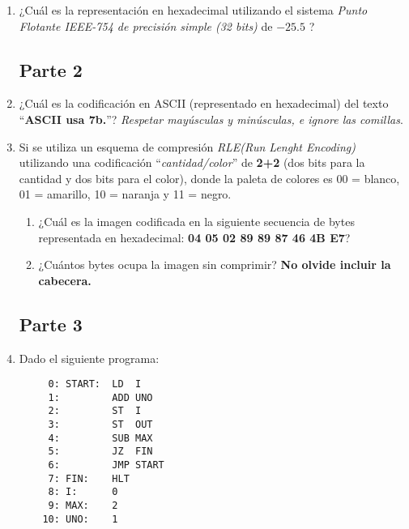 \documentclass[12pt]{article}
\begin{document}
\begin{enumerate}
    \item ¿Cuál es la representación en hexadecimal utilizando el sistema
        \emph{Punto Flotante IEEE-754 de precisión simple (32 bits)} de
        $-25.5$ ?

\subsection*{Parte 2}

    \item ¿Cuál es la codificación en ASCII (representado en hexadecimal) del
        texto ``\textbf{ASCII usa 7b.}''? \emph{Respetar mayúsculas y
        minúsculas, e ignore las comillas}.

    \item Si se utiliza un esquema de compresión \emph{RLE(Run Lenght
        Encoding)} utilizando una codificación ``\emph{cantidad/color}'' de
        \textbf{2+2} (dos bits para la cantidad y dos bits para el color),
        donde la paleta de colores es 00 = blanco, 01 = amarillo, 10 = naranja
        y 11 = negro.

        \begin{enumerate}

            \item ¿Cuál es la imagen codificada en la siguiente secuencia de
                bytes representada en hexadecimal: \textbf{04 05 02 89 89 87
                46 4B E7}?

            \item ¿Cuántos bytes ocupa la imagen sin comprimir? \textbf{No
                olvide incluir la cabecera.}

        \end{enumerate}


\subsection*{Parte 3}

    \item Dado el siguiente programa:

        \begin{verbatim}
     0: START:  LD  I
     1:         ADD UNO
     2:         ST  I
     3:         ST  OUT
     4:         SUB MAX
     5:         JZ  FIN
     6:         JMP START
     7: FIN:    HLT
     8: I:      0
     9: MAX:    2
    10: UNO:    1
        \end{verbatim}

        \begin{enumerate}


\end{enumerate}
\end{enumerate}
\end{document}
